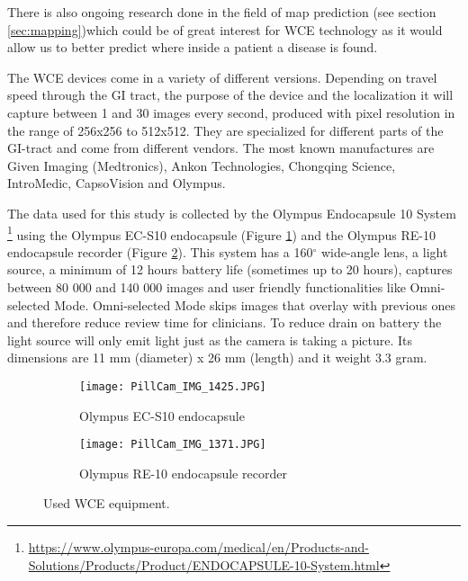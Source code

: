 \documentclass[thesis.tex]{subfiles}
\begin{document}
There is also ongoing research done in the field of map prediction (see section \ref{sec:mapping})which could be of great interest for WCE technology as it would allow us to better predict where inside a patient a disease is found.

The WCE devices come in a variety of different versions. Depending on travel speed through the GI tract, the purpose of the device and the localization it will capture between 1 and 30 images every second, produced with pixel resolution in the range of 256x256 to 512x512. They are specialized for different parts of the GI-tract and come from different vendors. The most known manufactures are Given Imaging (Medtronics), Ankon Technologies, Chongqing Science, IntroMedic, CapsoVision and Olympus.

The data used for this study is collected by the Olympus Endocapsule 10 System \footnote{\url{https://www.olympus-europa.com/medical/en/Products-and-Solutions/Products/Product/ENDOCAPSULE-10-System.html}} using the Olympus EC-S10 endocapsule (Figure \ref{fig:ec-s10}) and the Olympus RE-10 endocapsule recorder (Figure \ref{fig:re-10}). This system has a 160$^{\circ}$ wide-angle lens, a light source, a minimum of 12 hours battery life (sometimes up to 20 hours), captures between 80 000 and 140 000 images and user friendly functionalities like Omni-selected Mode. Omni-selected Mode skips images that overlay with previous ones and therefore reduce review time for clinicians. To reduce drain on battery the light source will only emit light just as the camera is taking a picture. Its dimensions are 11 mm (diameter) x 26 mm (length) and it weight 3.3 gram.

\begin{figure} %
  \centering
  \begin{subfigure}[b]{0.4\linewidth}
    \centering
    \texttt{[image: PillCam\_IMG\_1425.JPG]}
    \caption{Olympus EC-S10 endocapsule}
    \label{fig:ec-s10}
  \end{subfigure}
  \begin{subfigure}[b]{0.4\linewidth}
    \centering
    \texttt{[image: PillCam\_IMG\_1371.JPG]}
    \caption{Olympus RE-10 endocapsule recorder}
    \label{fig:re-10}
  \end{subfigure}
  \caption[Used WCE equipment.]{Used WCE equipment.}
  \label{fig:olympus_endocapsule_10}
\end{figure}
\end{document}
